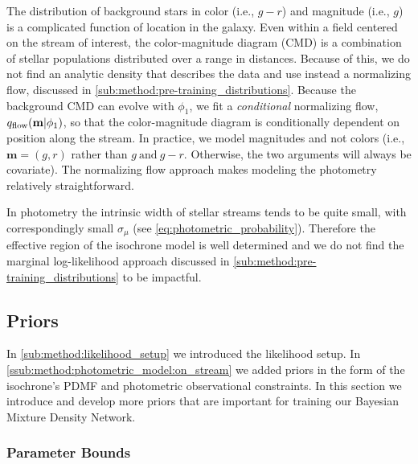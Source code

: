 \documentclass[twocolumn, linenumbers]{aastex631}
\begin{document}
            The distribution of background stars in color (i.e., $g-r$) and
            magnitude (i.e., $g$) is a complicated function of location in the
            galaxy. Even within a field centered on the stream of interest, the
            color-magnitude diagram (CMD) is a combination of stellar
            populations distributed over a range in distances. Because of this,
            we do not find an analytic density that describes the data and use
            instead a normalizing flow, discussed in
            \autoref{sub:method:pre-training_distributions}.  Because the
            background CMD can evolve with $\phi_1$, we fit a \emph{conditional}
            normalizing flow, $q_{\rm flow}(\mathbf{m}|\phi_1)$, so that the
            color-magnitude diagram is conditionally dependent on position along
            the stream. In practice, we model magnitudes and not colors (i.e.,
            $\mathbf{m} = (g,r)$ rather than $g \ \mathrm{and} \ g-r$.
            Otherwise, the two arguments will always be covariate). The
            normalizing flow approach makes modeling the photometry relatively
            straightforward.

            In photometry the intrinsic width of stellar streams tends to be
            quite small, with correspondingly small $\sigma_\mu$ (see
            \autoref{eq:photometric_probability}). Therefore the effective
            region of the isochrone model is well determined and we do not find
            the marginal log-likelihood approach discussed in
            \autoref{sub:method:pre-training_distributions} to be impactful.



    \subsection{Priors} \label{sub:methods:priors}

        In \autoref{sub:method:likelihood_setup} we introduced the likelihood
        setup. In \autoref{ssub:method:photometric_model:on_stream} we added
        priors in the form of the isochrone's PDMF and photometric observational
        constraints. In this section we introduce and develop more priors that
        are important for training our Bayesian Mixture Density Network.

        \subsubsection{Parameter Bounds} \label{ssub:methods:priors:parameter_bounds}
\end{document}

